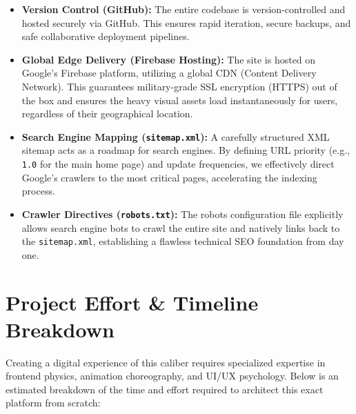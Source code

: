 \documentclass[11pt, a4paper]{article}
\begin{document}
\begin{itemize}[label=\textcolor{orluxgold}{\textbullet}]
    \item \textbf{Version Control (GitHub):} The entire codebase is version-controlled and hosted securely via GitHub. This ensures rapid iteration, secure backups, and safe collaborative deployment pipelines.
    \item \textbf{Global Edge Delivery (Firebase Hosting):} The site is hosted on Google's Firebase platform, utilizing a global CDN (Content Delivery Network). This guarantees military-grade SSL encryption (HTTPS) out of the box and ensures the heavy visual assets load instantaneously for users, regardless of their geographical location.
    \item \textbf{Search Engine Mapping (\texttt{sitemap.xml}):} A carefully structured XML sitemap acts as a roadmap for search engines. By defining URL priority (e.g., \texttt{1.0} for the main home page) and update frequencies, we effectively direct Google's crawlers to the most critical pages, accelerating the indexing process.
    \item \textbf{Crawler Directives (\texttt{robots.txt}):} The robots configuration file explicitly allows search engine bots to crawl the entire site and natively links back to the \texttt{sitemap.xml}, establishing a flawless technical SEO foundation from day one.
\end{itemize}

\section{Project Effort \& Timeline Breakdown}
Creating a digital experience of this caliber requires specialized expertise in frontend physics, animation choreography, and UI/UX psychology. Below is an estimated breakdown of the time and effort required to architect this exact platform from scratch:
\end{document}
